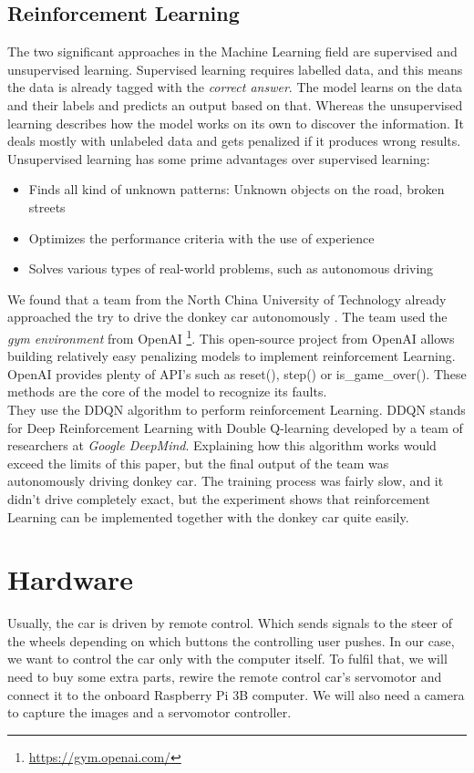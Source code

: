 \documentclass[journal]{IEEEtran}
\begin{document}
\subsection{Reinforcement Learning}
The two significant approaches in the Machine Learning field are supervised and unsupervised learning. Supervised learning requires labelled data, and this means the data is already tagged with the \textit{correct answer}. The model learns on the data and their labels and predicts an output based on that. Whereas the unsupervised learning describes how the model works on its own to discover the information. It deals mostly with unlabeled data and gets penalized if it produces wrong results. Unsupervised learning has some prime advantages over supervised learning:
\begin{itemize}
\item Finds all kind of unknown patterns: Unknown objects on the road, broken streets
\item Optimizes the performance criteria with the use of experience
\item Solves various types of real-world problems, such as autonomous driving
\end{itemize}
We found that a team from the North China University of Technology already approached the try to drive the donkey car autonomously \cite{reinforcement}. The team used the \textit{gym environment} from OpenAI \footnote{\url{https://gym.openai.com/}}. This open-source project from OpenAI allows building relatively easy penalizing models to implement reinforcement Learning. OpenAI provides plenty of API's such as reset(), step() or is\_game\_over(). These methods are the core of the model to recognize its faults. \\
They use the DDQN algorithm to perform reinforcement Learning. DDQN stands for Deep Reinforcement Learning with Double Q-learning \cite{reinforcement2} developed by a team of researchers at \textit{Google DeepMind}. Explaining how this algorithm works would exceed the limits of this paper, but the final output of the team \cite{reinforcement} was autonomously driving donkey car. The training process was fairly slow, and it didn't drive completely exact, but the experiment shows that reinforcement Learning can be implemented together with the donkey car quite easily.
\section{Hardware}
Usually, the car is driven by remote control. Which sends signals to the steer of the wheels depending on which buttons the controlling user pushes. In our case, we want to control the car only with the computer itself. To fulfil that, we will need to buy some extra parts, rewire the remote control car’s servomotor and connect it to the onboard Raspberry Pi 3B computer. We will also need a camera to capture the images and a servomotor controller.
\end{document}
